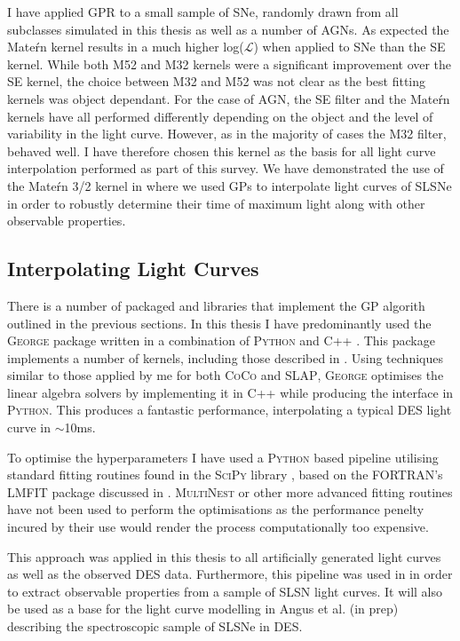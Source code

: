 I have applied GPR to a small sample of SNe, randomly drawn from all subclasses simulated in this thesis as well as a number of AGNs. As expected the Mate\'rn kernel results in a much higher log($\mathcal{L}$) when applied to SNe than the SE kernel. While both M52 and M32 kernels were a significant improvement over the SE kernel, the choice between M32 and M52 was not clear as the best fitting kernels was object dependant. For the case of AGN, the SE filter and the Mate\'rn kernels have all performed differently depending on the object and the level of variability in the light curve. However, as in the majority of cases the M32 filter, behaved  well. I have therefore chosen this kernel as the basis for all light curve interpolation performed as part of this survey. We have demonstrated the use of the Mate\'rn 3/2 kernel in \citet{Inserra2018} where we used GPs to interpolate light curves of SLSNe in order to robustly determine their time of maximum light along with other observable properties.

\subsection{Interpolating Light Curves}
There is a number of packaged and libraries that implement the GP algorith outlined in the previous sections. In this thesis I have predominantly used the \textsc{George} package written in a combination of \textsc{Python} and \textsc{C++} \citep{Ambikasaran2014}. This package implements a number of kernels, including those described in . Using techniques similar to those applied by me for both \textsc{CoCo} and \textsc{SLAP}, \textsc{George} optimises the linear algebra solvers by implementing it in \textsc{C++} while producing the interface in \textsc{Python}. This produces a fantastic performance, interpolating a typical DES light curve in $\sim$10ms.

To optimise the hyperparameters I have used a \textsc{Python} based pipeline utilising standard fitting routines found in the \textsc{SciPy} library \citep{Oliphant2007}, based on the \textsc{FORTRAN}'s \textsc{LMFIT} package discussed in . \textsc{MultiNest} or other more advanced fitting routines have not been used to perform the optimisations as the performance penelty incured by their use would render the process computationally too expensive.

This approach was applied in this thesis to all artificially generated light curves as well as the observed DES data. Furthermore, this pipeline was used in \citet{Inserra2018} in order to extract observable properties from a sample of SLSN light curves. It will also be used as a base for the light curve modelling in Angus et al. (in prep) describing the spectroscopic sample of SLSNe in DES.

